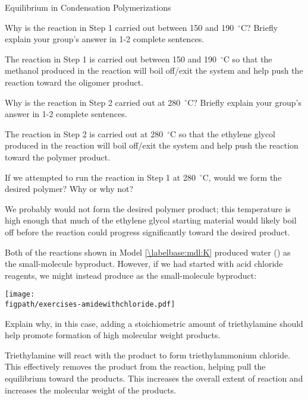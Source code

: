 \begin{activity}{Equilibrium in Condensation Polymerizations}
\begin{ctqs}
	\question Why is the reaction in Step 1 carried out between 150 and 190~${}^\circ$C?  Briefly explain your group's answer in 1-2 complete sentences.
	
		\begin{solution}[1.25in]{}
			The reaction in Step 1 is carried out between 150 and 190~${}^\circ$C so that the methanol produced in the reaction will boil off/exit the system and help push the reaction toward the oligomer product.
		\end{solution}
	
	\question Why is the reaction in Step 2 carried out at 280~${}^\circ$C?  Briefly explain your group's answer in 1-2 complete sentences.
	
		\begin{solution}[1.25in]{}
			The reaction in Step 2 is carried out at 280~${}^\circ$C so that the ethylene glycol produced in the reaction will boil off/exit the system and help push the reaction toward the polymer product.
		\end{solution}
	
	\question If we attempted to run the reaction in Step 1 at 280~${}^\circ$C, would we form the desired polymer? Why or why not?
	
		\begin{solution}[1.25in]{}
			We probably would not form the desired polymer product; this temperature is high enough that much of the ethylene glycol starting material would likely boil off before the reaction could progress significantly toward the desired product.
		\end{solution}
		
\end{ctqs}
	


\begin{exercises}

		\exercise Both of the reactions shown in Model \ref{\labelbase:mdl:K} produced water () as the small-molecule byproduct.  However, if we had started with acid chloride reagents, we might instead produce  as the small-molecule byproduct:
		
		\centerline{\texttt{[image: \\figpath/exercises-amidewithchloride.pdf]}}
		
		Explain why, in this case, adding a stoichiometric amount of triethylamine should help promote formation of high molecular weight products.
		
			\begin{solution}{}
					Triethylamine will react with the  product to form triethylammonium chloride.  This effectively removes the  product from the reaction, helping pull the equilibrium toward the products.  This increases the overall extent of reaction and increases the molecular weight of the products.
			\end{solution}
			

\end{exercises}
\end{activity}
